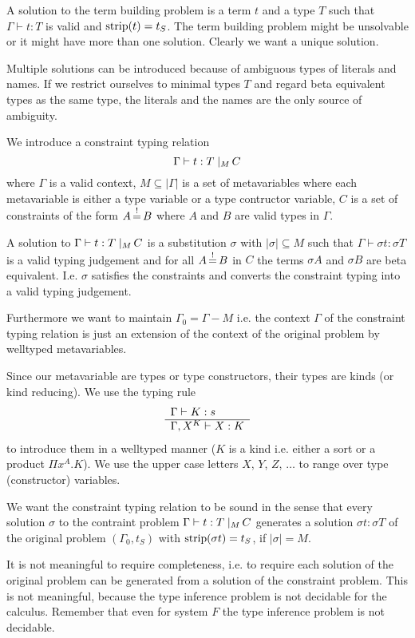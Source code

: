A solution to the term building problem is a term $t$ and a type $T$ such that
$\Gamma \vdash t: T$ is valid and $\text{strip}(t) = t_S$. The term building problem
might be unsolvable or it might have more than one solution. Clearly we want a
unique solution.

Multiple solutions can be introduced because of ambiguous types of literals and
names. If we restrict ourselves to minimal types $T$ and regard beta equivalent
types as the same type, the literals and the names are the only source of
ambiguity.


We introduce a constraint typing relation
$$
\Gamma \vdash t:T \; |_{M} \, C
$$
where $\Gamma$ is a valid context, $M \subseteq |\Gamma|$ is a set of
metavariables where each metavariable is either a type variable or a type
contructor variable, $C$ is a set of constraints of the form $A {\,\stackrel{!}{=}\,} B$ where
$A$ and $B$ are valid types in $\Gamma$.

A solution to $\Gamma \vdash t:T \; |_{M} \, C$ is a substitution $\sigma$ with
$|\sigma| \subseteq M$ such that $\Gamma \vdash \sigma t: \sigma T$ is a valid
typing judgement and for all $A{\,\stackrel{!}{=}\,} B$ in $C$ the terms $\sigma A$ and
$\sigma B$ are beta equivalent. I.e. $\sigma$ satisfies the constraints and
converts the constraint typing into a valid typing judgement.

Furthermore we want to maintain $\Gamma_0 = \Gamma - M$ i.e. the context
$\Gamma$ of the constraint typing relation is just an extension of the context
of the original problem by welltyped metavariables.

Since our metavariable are types or type constructors, their types are kinds (or
kind reducing). We use the typing rule
$$
\begin{array}{l} \Gamma \vdash K: s \\ \hline \Gamma, X^K \vdash X: K\end{array}
$$
to introduce them in a welltyped manner ($K$ is a kind i.e. either a sort or a
product $\Pi x^A. K$). We use the upper case letters $X$, $Y$, $Z$, $\ldots$ to
range over type (constructor) variables.


We want the constraint typing relation to be sound in the sense that every
solution $\sigma$ to the contraint problem
$\Gamma \vdash t:T \; |_{M} \, C$
generates a solution $\sigma t:
\sigma T$ of the original problem $(\Gamma_0,t_S)$ with $\text{strip}(\sigma t) =
t_S$, if $|\sigma| = M$.

It is not meaningful to require completeness, i.e. to require each solution of
the original problem can be generated from a solution of the constraint problem.
This is not meaningful, because the type inference problem is not decidable for
the calculus. Remember that even for system $F$ the type inference problem is
not decidable.

